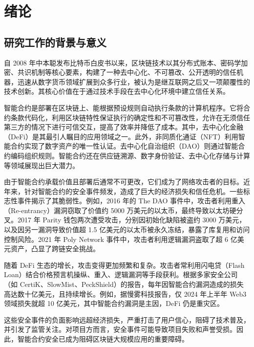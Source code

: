 \documentclass[print, master, vlined, timesmath]{DissertUESTC}
\begin{document}
\chapter{绪\hspace{6pt}论}

\section{研究工作的背景与意义}

自 2008 年中本聪发布比特币白皮书\cite{}以来，区块链技术以其分布式账本、密码学加密、共识机制等核心要素，构建了一种去中心化、不可篡改、公开透明的信任机器，迅速从数字货币领域扩展到众多行业，被认为是继互联网之后又一项颠覆性的技术创新\cite{}。其核心价值在于通过技术手段在去中心化环境中建立信任关系。

智能合约是部署在区块链上、能根据预设规则自动执行条款的计算机程序。它将合约条款代码化，利用区块链特性保证执行的确定性和不可篡改性，允许在无须信任第三方的情况下进行可信交互，提高了效率并降低了成本。其中，去中心化金融（DeFi）\cite{}是其最引人瞩目的应用领域之一。此外，非同质化通证（NFT）\cite{}利用智能合约实现了数字资产的唯一性认证。去中心化自治组织（DAO）\cite{}则通过智能合约编码组织规则。智能合约还在供应链溯源\cite{}、数字身份验证\cite{}、去中心化存储与计算\cite{}等领域展现出巨大潜力。

由于智能合约承载价值且部署后通常不可更改，它们成为了网络攻击者的目标。近年来，针对智能合约的安全事件频发，造成了巨大的经济损失和信任危机。一些标志性事件揭示了其脆弱性。例如，2016 年的 The DAO 事件中，攻击者利用重入（Re-entrancy）漏洞\cite{}窃取了价值约 5000 万美元的以太币，最终导致以太坊硬分叉\cite{}。2017 年 Parity 钱包两次遭受攻击，分别因初始化缺陷被盗约 3000 万美元\cite{}，以及因另一漏洞导致价值超 1.5 亿美元的以太币被永久冻结\cite{}，暴露了库复用和访问控制风险。2021 年 Poly Network 事件中，攻击者利用逻辑漏洞盗取了超 6 亿美元资产\cite{}，凸显了跨链安全挑战。

随着 DeFi 生态的增长，攻击变得更加频繁和复杂。攻击者常利用闪电贷（Flash Loan）\cite{}结合价格预言机操纵\cite{}、重入、逻辑漏洞等手段获利\cite{}。根据多家安全公司（如 CertiK\cite{}、SlowMist\cite{}、PeckShield\cite{}）的报告，每年因智能合约漏洞造成的损失高达数十亿美元，且持续增长。例如，据慢雾科技报告，仅 2024 年上半年 Web3 领域损失就超 10 亿美元\cite{}，其中智能合约漏洞是主因，DeFi 仍是重灾区。

这些安全事件的负面影响远超经济损失，严重打击了用户信心，阻碍了技术普及，并引发了监管关注\cite{}。对项目方而言，安全事件可能导致项目失败和声誉受损。因此，智能合约安全已成为阻碍区块链大规模应用的重要障碍。
\end{document}
